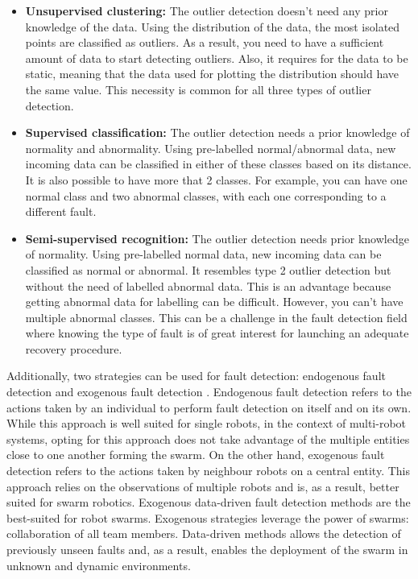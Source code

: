 \begin{itemize}
    \item \textbf{Unsupervised clustering:} The outlier detection doesn’t need any prior knowledge of the data. Using the distribution of the data, the most isolated points are classified as outliers. As a result, you need to have a sufficient amount of data to start detecting outliers. Also, it requires for the data to be static, meaning that the data used for plotting the distribution should have the same value. This necessity is common for all three types of outlier detection.
    \item \textbf{Supervised classification:} The outlier detection needs a prior knowledge of normality and abnormality. Using pre-labelled normal/abnormal data, new incoming data can be classified in either of these classes based on its distance. It is also possible to have more that 2 classes. For example, you can have one normal class and two abnormal classes, with each one corresponding to a different fault. 
    \item \textbf{Semi-supervised recognition:} The outlier detection needs prior knowledge of normality. Using pre-labelled normal data, new incoming data can be classified as normal or abnormal. It resembles type 2 outlier detection but without the need of labelled abnormal data. This is an advantage because getting abnormal data for labelling can be difficult. However, you can’t have multiple abnormal classes. This can be a challenge in the fault detection field where knowing the type of fault is of great interest for launching an adequate recovery procedure.
\end{itemize}


Additionally, two strategies can be used for fault detection: endogenous fault detection and exogenous fault detection \cite{christensen2008fault, lau2012error, Miller2021modern}. Endogenous fault detection refers to the actions taken by an individual to perform fault detection on itself and on its own. While this approach is well suited for single robots, in the context of multi-robot systems, opting for this approach does not take advantage of the multiple entities close to one another forming the swarm. On the other hand, exogenous fault detection refers to the actions taken by neighbour robots on a central entity. This approach relies on the observations of multiple robots and is, as a result, better suited for swarm robotics. Exogenous data-driven fault detection methods are the best-suited for robot swarms. Exogenous strategies leverage the power of swarms: collaboration of all team members. Data-driven methods allows the detection of previously unseen faults and, as a result, enables the deployment of the swarm in unknown and dynamic environments.


